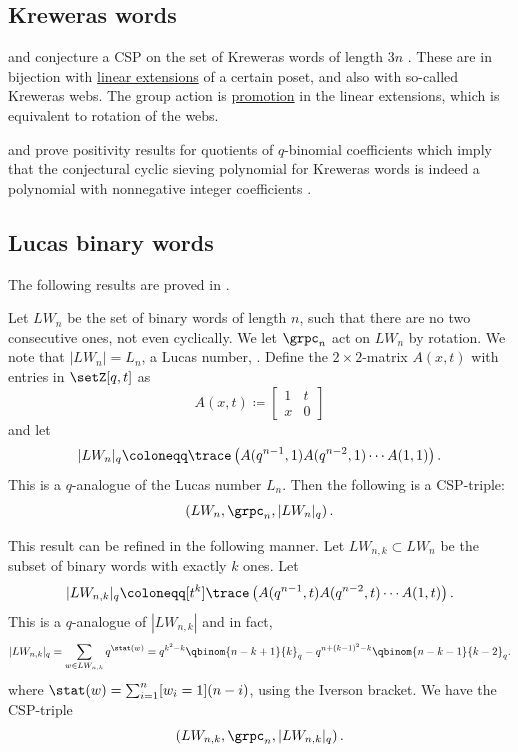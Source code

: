\subsection[cspKrewerasWords]{Kreweras words}

 and  conjecture a CSP on the set of
Kreweras words of length $3n$ \cite{HopkinsRubey2021}.  These are in
bijection with \hyperref[linearExtension]{linear extensions} of a certain
poset, and also with so-called Kreweras webs.  The group action is
\hyperref[promotion]{promotion} in the linear extensions, which is equivalent
to rotation of the webs.

 and  prove positivity
results for quotients of $q$-binomial coefficients which imply that the
conjectural cyclic sieving polynomial for Kreweras words is indeed a
polynomial with nonnegative integer coefficients
\cite{GatzweilerKrattenthaler2025x}.


\subsection[cspLucasWords]{Lucas binary words}

The following results are proved in \cite{Gorodetsky2019}.

Let $LW_{n}$ be the set of binary words of length $n$,
such that there are no two consecutive ones, not even cyclically.
We let $\grpc_n$ act on $LW_{n}$ by rotation.
We note that $|LW_{n}|= L_n$, a Lucas number, .
Define the $2\times 2$-matrix $A(x,t)$ with entries in $\setZ[q,t]$ as
\[
A(x,t)\coloneqq
\begin{bmatrix}
1 & t \\
x & 0
\end{bmatrix}
\]
and let
\[
|LW_{n}|_q
\coloneqq
\trace \left(  A(q^{n-1},1)  A(q^{n-2},1) \dotsm  A(1,1) \right).
\]
This is a $q$-analogue of the Lucas number $L_{n}$.
Then the following is a CSP-triple:
\[
\left( LW_n, \grpc_n, |LW_{n}|_q \right).
\]

This result can be refined in the following manner.
Let $LW_{n,k}\subset LW_{n}$ be the subset of binary words with exactly $k$ ones.
Let
\[
|LW_{n,k}|_q
\coloneqq
[t^k] \trace \left(  A(q^{n-1},t)  A(q^{n-2},t) \dotsm  A(1,t) \right).
\]
This is a $q$-analogue of $|LW_{n,k}|$ and in fact,
\[
|LW_{n,k}|_q = \sum_{w \in LW_{n,k}}  q^{\stat(w)}
= q^{k^2-k}\qbinom{n-k+1}{k}_q -
q^{n+(k-1)^2-k}\qbinom{n-k-1}{k-2}_q.
\]
where $\stat(w) = \sum_{i=1}^n [w_i=1] (n-i)$, using the Iverson bracket.
We have the CSP-triple
\[
\left( LW_{n,k}, \grpc_n, |LW_{n,k}|_q \right).
\]



